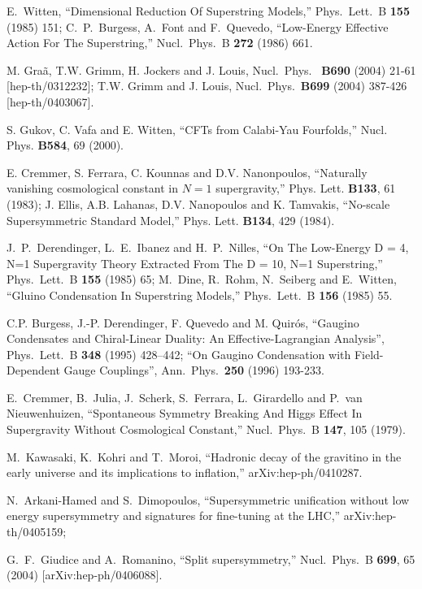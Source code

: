 \documentclass[12pt]{JHEP3}
\begin{document}
\begin{thebibliography}{4}
E.~Witten, ``Dimensional Reduction Of Superstring Models,'' Phys.\
Lett.\ B {\bf 155} (1985) 151;
%
C.~P.~Burgess, A.~Font and F.~Quevedo, ``Low-Energy Effective
Action For The Superstring,'' Nucl.\ Phys.\ B {\bf 272} (1986)
661.

M. Gra\~a, T.W. Grimm, H. Jockers and J. Louis, Nucl.\ Phys.\ {\bf
B690} (2004) 21-61 [hep-th/0312232];
%
T.W. Grimm and J. Louis, Nucl.\ Phys.\ {\bf B699} (2004) 387-426
[hep-th/0403067].

S. Gukov, C. Vafa and E. Witten, ``CFTs from Calabi-Yau
Fourfolds,'' Nucl. Phys. {\bf B584}, 69 (2000).

E. Cremmer, S. Ferrara, C. Kounnas and D.V. Nanonpoulos,
``Naturally vanishing cosmological constant in $N=1$
supergravity,'' Phys. Lett. {\bf B133}, 61 (1983);
%
J. Ellis, A.B. Lahanas, D.V. Nanopoulos and K. Tamvakis,
``No-scale Supersymmetric Standard Model,'' Phys. Lett. {\bf
B134}, 429 (1984).

J.~P.~Derendinger, L.~E.~Ibanez and H.~P.~Nilles, ``On The
Low-Energy D = 4, N=1 Supergravity Theory Extracted From The D =
10, N=1 Superstring,'' Phys.\ Lett.\ B {\bf 155} (1985) 65;
%
M.~Dine, R.~Rohm, N.~Seiberg and E.~Witten, ``Gluino Condensation
In Superstring Models,'' Phys.\ Lett.\ B {\bf 156} (1985) 55.

C.P. Burgess, J.-P. Derendinger, F. Quevedo and M. Quir\'os,
``Gaugino Condensates and Chiral-Linear Duality: An
Effective-Lagrangian Analysis'', Phys.\ Lett.\ B {\bf 348} (1995)
428--442;
``On Gaugino Condensation with Field-Dependent Gauge Couplings'',
Ann.\ Phys.\ {\bf 250} (1996) 193-233.

E.~Cremmer, B.~Julia, J.~Scherk, S.~Ferrara, L.~Girardello and
P.~van Nieuwenhuizen, ``Spontaneous Symmetry Breaking And Higgs
Effect In Supergravity Without Cosmological Constant,'' Nucl.\
Phys.\ B {\bf 147}, 105 (1979).

M.~Kawasaki, K.~Kohri and T.~Moroi,
``Hadronic decay of the gravitino in the early universe and its implications
to inflation,''
arXiv:hep-ph/0410287.


N.~Arkani-Hamed and S.~Dimopoulos,
``Supersymmetric unification without low energy supersymmetry and signatures
for fine-tuning at the LHC,''
arXiv:hep-th/0405159;

G.~F.~Giudice and A.~Romanino,
``Split supersymmetry,''
Nucl.\ Phys.\ B {\bf 699}, 65 (2004)
[arXiv:hep-ph/0406088].



\end{thebibliography}
\end{document}
